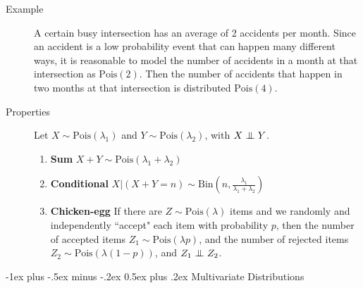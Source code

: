 \documentclass[6pt, landscape]{article}
\makeatletter
\renewcommand{\section}{\@startsection{section}{1}{0mm}%
                                {-1ex plus -.5ex minus -.2ex}%
                                {0.5ex plus .2ex}%
                                {\normalfont\bfseries}}
\newcommand{\Bin}{\textrm{Bin}}
\newcommand{\Pois}{\textrm{Pois}}
\newcommand\independent{\protect\mathpalette{\protect\independenT}{\perp}}
\def\independenT#1#2{\mathrel{\setbox0\hbox{$#1#2$}%
    \copy0\kern-\wd0\mkern4mu\box0}}
\makeatother
\begin{document}
\begin{multicols}{3}
\begin{description}
                \item[Example] A certain busy intersection has an average of 2 accidents per month. Since an accident is a low probability event that can happen many different ways, it is reasonable to model the number of accidents in a month at that intersection as $\Pois(2)$. Then the number of accidents that happen in two months at that intersection is distributed $\Pois(4)$.

                \item[Properties]
                      Let $X \sim \Pois(\lambda_1)$ and $Y \sim \Pois(\lambda_2)$, with $X \independent Y$.

                      \begin{enumerate}
                              \item \textbf{Sum} $X + Y \sim \Pois(\lambda_1 + \lambda_2)$
                              \item \textbf{Conditional} $X | (X + Y = n) \sim \Bin\left(n, \frac{\lambda_1}{\lambda_1 + \lambda_2}\right)$
                              \item \textbf{Chicken-egg} If there are $Z \sim \Pois(\lambda)$ items and we randomly and independently ``accept" each item with probability $p$, then the number of accepted items $Z_1 \sim \Pois(\lambda p)$, and the number of rejected items $Z_2 \sim \Pois(\lambda (1-p))$, and $Z_1 \independent Z_2$.
                      \end{enumerate}

        \end{description}


        \section{Multivariate Distributions}



\end{multicols}
\end{document}
